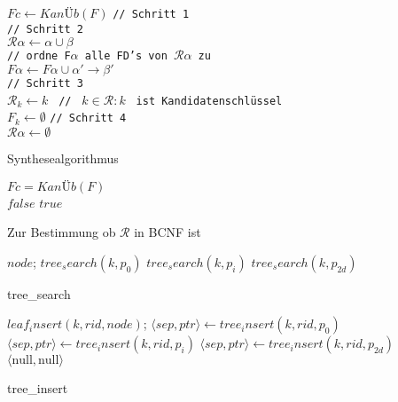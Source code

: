 \documentclass{article}
\begin{document}
		\begin{algorithm}[H]
			\SetAlgoLined
			$Fc \leftarrow Kan\textit{\"U}b(F)$ \texttt{// Schritt 1}\\
			\texttt{// Schritt 2}\\
			 {
				$\mathcal{R}\alpha \leftarrow \alpha \cup \beta$\\
				 {
					\texttt{// ordne F$\alpha$ alle FD's von $\mathcal{R}\alpha$ zu}\\
					 {
						$F\alpha \leftarrow F\alpha \cup \alpha' \rightarrow \beta'$\\
					}
				}
			}
			\texttt{// Schritt 3}\\
			 {
				$\mathcal{R}_k \leftarrow k $ \texttt{ // } $k \in \mathcal{R}: k $ \texttt{ ist Kandidatenschl\"ussel}\\
				$F_k \leftarrow \emptyset$
			}
			\texttt{// Schritt 4}\\
			 {
				$\mathcal{R}\alpha \leftarrow \emptyset$\\
			}
			\caption{Synthesealgorithmus}
		\end{algorithm}
		\begin{algorithm}[H]
			\SetAlgoLined
			$Fc = \textit{Kan\"Ub}(F)$\\
			 {
				 {
					\Return $false$
				}
			}
			\Return $true$
			\caption{Zur Bestimmung ob $\mathcal{R}$ in BCNF ist}
		\end{algorithm}
		\begin{algorithm}[H]
			\SetAlgoLined
			 {
				\Return $node$;
			}
			 {
				 {
					\Return $tree_search(k, p_0)$
				}
				 {
					\Return $tree_search(k, p_i)$
				}
				 {
					\Return $tree_search(k, p_{2d})$
				}
			}
			\caption{tree\_search}
		\end{algorithm}
		\begin{algorithm}[H]
			\SetAlgoLined
			 {
				\Return $leaf_insert(k, rid, node)$;
			}
			 {
				 {
					$\langle sep, ptr \rangle \leftarrow tree_insert(k, rid, p_0)$
				}
				 {
					$\langle sep, ptr \rangle \leftarrow tree_insert(k, rid, p_i)$
				}
				 {
					$\langle sep, ptr \rangle \leftarrow tree_insert(k, rid, p_{2d})$
				}
			}
			 {
				\Return $\langle \text{null}, \text{null} \rangle$
			} 
			\caption{tree\_insert}
		\end{algorithm}
\end{document}
